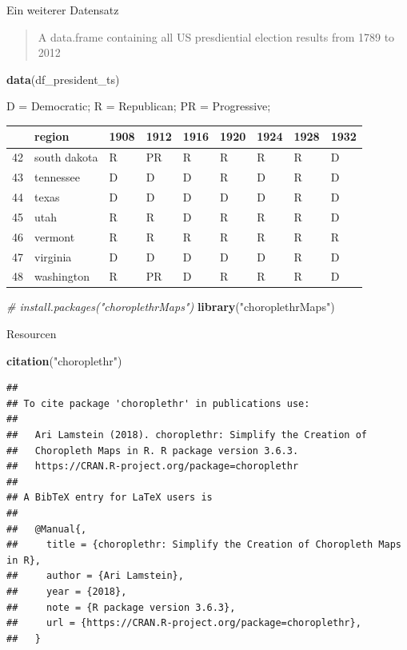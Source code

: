 \documentclass[ignorenonframetext,]{beamer}
\newenvironment{Shaded}{\begin{snugshade}}{\end{snugshade}}
\newcommand{\KeywordTok}[1]{\textcolor[rgb]{0.13,0.29,0.53}{\textbf{#1}}}
\newcommand{\StringTok}[1]{\textcolor[rgb]{0.31,0.60,0.02}{#1}}
\newcommand{\CommentTok}[1]{\textcolor[rgb]{0.56,0.35,0.01}{\textit{#1}}}
\newcommand{\NormalTok}[1]{#1}
\begin{document}
\begin{frame}[fragile]{Ein weiterer Datensatz}

\begin{quote}
A data.frame containing all US presdiential election results from 1789
to 2012
\end{quote}

\begin{Shaded}
\begin{Highlighting}[]
\KeywordTok{data}\NormalTok{(df_president_ts)}
\end{Highlighting}
\end{Shaded}

D = Democratic; R = Republican; PR = Progressive;

\begin{longtable}[]{@{}lllllllll@{}}
\toprule
& region & 1908 & 1912 & 1916 & 1920 & 1924 & 1928 & 1932\tabularnewline
\midrule
\endhead
42 & south dakota & R & PR & R & R & R & R & D\tabularnewline
43 & tennessee & D & D & D & R & D & R & D\tabularnewline
44 & texas & D & D & D & D & D & R & D\tabularnewline
45 & utah & R & R & D & R & R & R & D\tabularnewline
46 & vermont & R & R & R & R & R & R & R\tabularnewline
47 & virginia & D & D & D & D & D & R & D\tabularnewline
48 & washington & R & PR & D & R & R & R & D\tabularnewline
\bottomrule
\end{longtable}

\begin{Shaded}
\begin{Highlighting}[]
\CommentTok{# install.packages("choroplethrMaps")}
\KeywordTok{library}\NormalTok{(}\StringTok{"choroplethrMaps"}\NormalTok{)}
\end{Highlighting}
\end{Shaded}

\end{frame}

\begin{frame}[fragile]{Resourcen}

\begin{Shaded}
\begin{Highlighting}[]
\KeywordTok{citation}\NormalTok{(}\StringTok{"choroplethr"}\NormalTok{)}
\end{Highlighting}
\end{Shaded}

\begin{verbatim}
## 
## To cite package 'choroplethr' in publications use:
## 
##   Ari Lamstein (2018). choroplethr: Simplify the Creation of
##   Choropleth Maps in R. R package version 3.6.3.
##   https://CRAN.R-project.org/package=choroplethr
## 
## A BibTeX entry for LaTeX users is
## 
##   @Manual{,
##     title = {choroplethr: Simplify the Creation of Choropleth Maps in R},
##     author = {Ari Lamstein},
##     year = {2018},
##     note = {R package version 3.6.3},
##     url = {https://CRAN.R-project.org/package=choroplethr},
##   }
\end{verbatim}

\end{frame}
\end{document}
